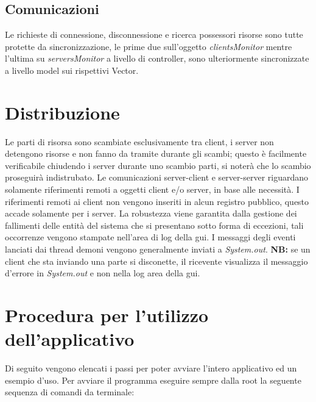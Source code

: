 \documentclass[
10pt, %
a4paper, %
oneside, %
BCOR5mm, %
]{scrartcl}
\begin{document}
	\subsection{Comunicazioni}
	Le richieste di connessione, disconnessione e ricerca possessori risorse sono tutte protette da sincronizzazione, le prime due sull'oggetto \textit{clientsMonitor} mentre l'ultima su \textit{serversMonitor} a livello di controller, sono ulteriormente sincronizzate a livello model sui rispettivi Vector.


\section{Distribuzione}

	Le parti di risorsa sono scambiate esclusivamente tra client, i server non detengono risorse e non fanno da tramite durante gli scambi; questo è facilmente verificabile chiudendo i server durante uno scambio parti, si noterà che lo scambio proseguirà indistrubato. Le comunicazioni server-client e server-server riguardano solamente riferimenti remoti a oggetti client e/o server, in base alle necessità.
	I riferimenti remoti ai client non vengono inseriti in alcun registro pubblico, questo accade solamente per i server.
	La robustezza viene garantita dalla gestione dei fallimenti delle entità del sistema che si presentano sotto forma di eccezioni, tali occorrenze vengono stampate nell'area di log della gui. I messaggi degli eventi lanciati dai thread demoni vengono generalmente inviati a \emph{System.out}. \textbf{NB:} se un client che sta inviando una parte si disconette, il ricevente visualizza il messaggio d'errore in \emph{System.out} e non nella log area della gui.


\section{Procedura per l'utilizzo dell'applicativo}
	
	Di seguito vengono elencati i passi per poter avviare l'intero applicativo ed un esempio d'uso. 
	Per avviare il programma eseguire sempre dalla root la seguente sequenza di comandi da terminale:
\end{document}
